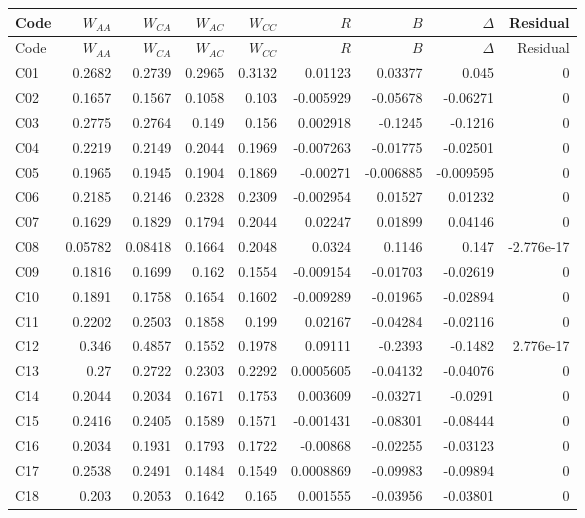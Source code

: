 \documentclass[10pt]{article}
\begin{document}
\small\setlength{\tabcolsep}{6pt}\begin{longtable}{@{}lrrrrrrrr@{}}
\toprule Code & $W_{AA}$ & $W_{CA}$ & $W_{AC}$ & $W_{CC}$ & $R$ & $B$ & $\Delta$ & Residual\\\midrule\endfirsthead
\toprule Code & $W_{AA}$ & $W_{CA}$ & $W_{AC}$ & $W_{CC}$ & $R$ & $B$ & $\Delta$ & Residual\\\midrule\endhead\bottomrule\endfoot
C01 & 0.2682 & 0.2739 & 0.2965 & 0.3132 & 0.01123 & 0.03377 & 0.045 & 0\\[1pt]
C02 & 0.1657 & 0.1567 & 0.1058 & 0.103 & -0.005929 & -0.05678 & -0.06271 & 0\\[1pt]
C03 & 0.2775 & 0.2764 & 0.149 & 0.156 & 0.002918 & -0.1245 & -0.1216 & 0\\[1pt]
C04 & 0.2219 & 0.2149 & 0.2044 & 0.1969 & -0.007263 & -0.01775 & -0.02501 & 0\\[1pt]
C05 & 0.1965 & 0.1945 & 0.1904 & 0.1869 & -0.00271 & -0.006885 & -0.009595 & 0\\[1pt]
C06 & 0.2185 & 0.2146 & 0.2328 & 0.2309 & -0.002954 & 0.01527 & 0.01232 & 0\\[1pt]
C07 & 0.1629 & 0.1829 & 0.1794 & 0.2044 & 0.02247 & 0.01899 & 0.04146 & 0\\[1pt]
C08 & 0.05782 & 0.08418 & 0.1664 & 0.2048 & 0.0324 & 0.1146 & 0.147 & -2.776e-17\\[1pt]
C09 & 0.1816 & 0.1699 & 0.162 & 0.1554 & -0.009154 & -0.01703 & -0.02619 & 0\\[1pt]
C10 & 0.1891 & 0.1758 & 0.1654 & 0.1602 & -0.009289 & -0.01965 & -0.02894 & 0\\[1pt]
C11 & 0.2202 & 0.2503 & 0.1858 & 0.199 & 0.02167 & -0.04284 & -0.02116 & 0\\[1pt]
C12 & 0.346 & 0.4857 & 0.1552 & 0.1978 & 0.09111 & -0.2393 & -0.1482 & 2.776e-17\\[1pt]
C13 & 0.27 & 0.2722 & 0.2303 & 0.2292 & 0.0005605 & -0.04132 & -0.04076 & 0\\[1pt]
C14 & 0.2044 & 0.2034 & 0.1671 & 0.1753 & 0.003609 & -0.03271 & -0.0291 & 0\\[1pt]
C15 & 0.2416 & 0.2405 & 0.1589 & 0.1571 & -0.001431 & -0.08301 & -0.08444 & 0\\[1pt]
C16 & 0.2034 & 0.1931 & 0.1793 & 0.1722 & -0.00868 & -0.02255 & -0.03123 & 0\\[1pt]
C17 & 0.2538 & 0.2491 & 0.1484 & 0.1549 & 0.0008869 & -0.09983 & -0.09894 & 0\\[1pt]
C18 & 0.203 & 0.2053 & 0.1642 & 0.165 & 0.001555 & -0.03956 & -0.03801 & 0\\[1pt]

\end{longtable}
\end{document}
